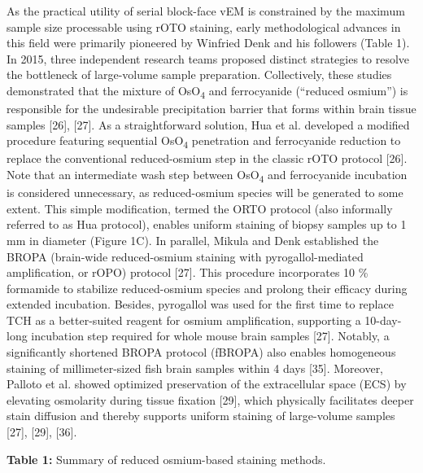 \documentclass{article}
\begin{document}
As the practical utility of serial block-face vEM is constrained by the maximum sample size processable using rOTO staining, early methodological advances in this field were primarily pioneered by Winfried Denk and his followers (Table 1). In 2015, three independent research teams proposed distinct strategies to resolve the bottleneck of large-volume sample preparation. Collectively, these studies demonstrated that the mixture of OsO\textsubscript{4} and ferrocyanide (“reduced osmium”) is responsible for the undesirable precipitation barrier that forms within brain tissue samples [26], [27]. As a straightforward solution, Hua et al. developed a modified procedure featuring sequential OsO\textsubscript{4} penetration and ferrocyanide reduction to replace the conventional reduced-osmium step in the classic rOTO protocol [26]. Note that an intermediate wash step between OsO\textsubscript{4} and ferrocyanide incubation is considered unnecessary, as reduced-osmium species will be generated to some extent. This simple modification, termed the ORTO protocol (also informally referred to as Hua protocol), enables uniform staining of biopsy samples up to 1 mm in diameter (Figure 1C). In parallel, Mikula and Denk established the BROPA (brain-wide reduced-osmium staining with pyrogallol-mediated amplification, or rOPO) protocol [27]. This procedure incorporates 10 \% formamide to stabilize reduced-osmium species and prolong their efficacy during extended incubation. Besides, pyrogallol was used for the first time to replace TCH as a better-suited reagent for osmium amplification, supporting a 10-day-long incubation step required for whole mouse brain samples [27]. Notably, a significantly shortened BROPA protocol (fBROPA) also enables homogeneous staining of millimeter-sized fish brain samples within 4 days [35]. Moreover, Palloto et al. showed optimized preservation of the extracellular space (ECS) by elevating osmolarity during tissue fixation [29], which physically facilitates deeper stain diffusion and thereby supports uniform staining of large-volume samples [27], [29], [36].

\noindent\textbf{Table 1:} Summary of reduced osmium-based staining methods.
\end{document}
